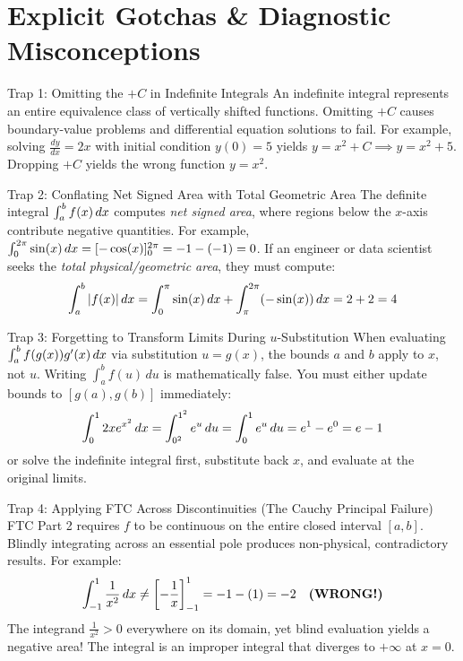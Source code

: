 \section{Explicit Gotchas \& Diagnostic Misconceptions}

\begin{trapbox}{Trap 1: Omitting the $+ C$ in Indefinite Integrals}
An indefinite integral represents an entire equivalence class of vertically shifted functions. Omitting $+C$ causes boundary-value problems and differential equation solutions to fail. For example, solving $\frac{dy}{dx} = 2x$ with initial condition $y(0) = 5$ yields $y = x^2 + C \implies y = x^2 + 5$. Dropping $+C$ yields the wrong function $y = x^2$.
\end{trapbox}

\begin{trapbox}{Trap 2: Conflating Net Signed Area with Total Geometric Area}
The definite integral $\int_a^b f(x) \,dx$ computes \textit{net signed area}, where regions below the $x$-axis contribute negative quantities. For example, $\int_0^{2\pi} \sin(x) \,dx = [-\cos(x)]_0^{2\pi} = -1 - (-1) = 0$. If an engineer or data scientist seeks the \textit{total physical/geometric area}, they must compute:
\begin{equation*}
\int_a^b |f(x)| \,dx = \int_0^\pi \sin(x) \,dx + \int_\pi^{2\pi} (-\sin(x)) \,dx = 2 + 2 = 4
\end{equation*}
\end{trapbox}

\begin{trapbox}{Trap 3: Forgetting to Transform Limits During $u$-Substitution}
When evaluating $\int_a^b f(g(x))g'(x) \,dx$ via substitution $u = g(x)$, the bounds $a$ and $b$ apply to $x$, not $u$. Writing $\int_a^b f(u) \, du$ is mathematically false. You must either update bounds to $[g(a), g(b)]$ immediately:
\begin{equation*}
\int_0^1 2x e^{x^2} \,dx = \int_{0^2}^{1^2} e^u \, du = \int_0^1 e^u \, du = e^1 - e^0 = e - 1
\end{equation*}
or solve the indefinite integral first, substitute back $x$, and evaluate at the original limits.
\end{trapbox}

\begin{trapbox}{Trap 4: Applying FTC Across Discontinuities (The Cauchy Principal Failure)}
FTC Part 2 requires $f$ to be continuous on the entire closed interval $[a, b]$. Blindly integrating across an essential pole produces non-physical, contradictory results. For example:
\begin{equation*}
\int_{-1}^1 \frac{1}{x^2} \,dx \ne \left[ -\frac{1}{x} \right]_{-1}^1 = -1 - (1) = -2 \quad \text{\textbf{(WRONG!)}}
\end{equation*}
The integrand $\frac{1}{x^2} > 0$ everywhere on its domain, yet blind evaluation yields a negative area! The integral is an improper integral that diverges to $+\infty$ at $x = 0$.
\end{trapbox}

